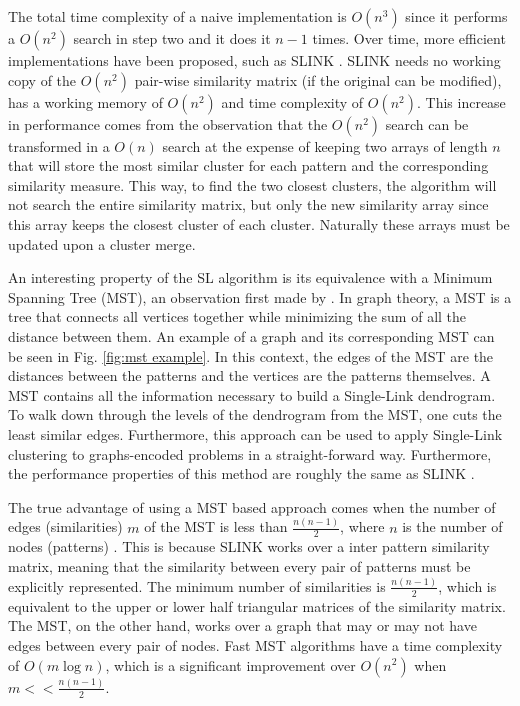 The total time complexity of a naive implementation is $O(n^3)$ since it performs a $O(n^2)$ search in step two and it does it $n-1$ times.
Over time, more efficient implementations have been proposed, such as SLINK \cite{Sibson1973}.
SLINK needs no working copy of the $O(n^2)$ pair-wise similarity matrix (if the original can be modified), has a working memory of $O(n^2)$ and time complexity of $O(n^2)$.
This increase in performance comes from the observation that the $O(n^2)$ search can be transformed in a $O(n)$ search at the expense of keeping two arrays of length $n$ that will store the most similar cluster for each pattern and the corresponding similarity measure.
This way, to find the two closest clusters, the algorithm will not search the entire similarity matrix, but only the new similarity array since this array keeps the closest cluster of each cluster.
Naturally these arrays must be updated upon a cluster merge.

An interesting property of the SL algorithm is its equivalence with a Minimum Spanning Tree (MST), an observation first made by \cite{Gower1969}.
In graph theory, a MST is a tree that connects all vertices together while minimizing the sum of all the distance between them.
An example of a graph and its corresponding MST can be seen in Fig. \ref{fig:mst example}.
In this context, the edges of the MST are the distances between the patterns and the vertices are the patterns themselves.
A MST contains all the information necessary to build a Single-Link dendrogram.
To walk down through the levels of the dendrogram from the MST, one cuts the least similar edges.
Furthermore, this approach can be used to apply Single-Link clustering to graphs-encoded problems in a straight-forward way.
Furthermore, the performance properties of this method are roughly the same as SLINK \cite{Mullner2011}.

The true advantage of using a MST based approach comes when the number of edges (similarities) $m$ of the MST is less than $\frac{n(n-1)}{2}$, where $n$ is the number of nodes (patterns) \cite{starck2007astronomical}.
This is because SLINK works over a inter pattern similarity matrix, meaning that the similarity between every pair of patterns must be explicitly represented.
The minimum number of similarities is $\frac{n(n-1)}{2}$, which is equivalent to the upper or lower half triangular matrices of the similarity matrix.
The MST, on the other hand, works over a graph that may or may not have edges between every pair of nodes.
Fast MST algorithms have a time complexity of $O(m \log n)$, which is a significant  improvement over $O(n^2)$ when $m << \frac{n(n-1)}{2}$.


